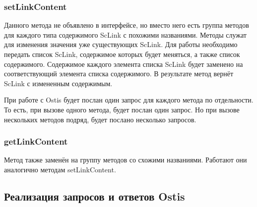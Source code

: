 \subsubsection{setLinkContent}
Данного метода не объявлено в интерфейсе, но вместо него есть группа методов для каждого типа содержимого ScLink с похожими названиями. Методы служат для изменения значения уже существующих ScLink. Для работы необходимо передать список ScLink, содержимое которых будет меняться, а также список содержимого. Содержимое каждого элемента списка ScLink будет заменено на соответствующий элемента списка содержимого. В результате метод вернёт ScLink с измененным содержимым. 

При работе с Ostis будет послан один запрос для каждого метода по отдельности. То есть, при вызове одного метода, будет послан один запрос. Но при вызове нескольких методов подряд, будет послано несколько запросов.

\subsubsection{getLinkContent}
Метод также заменён на группу методов со схожими названиями. Работают они аналогично методам setLinkContent. 

\subsection{Реализация запросов и ответов Ostis}


